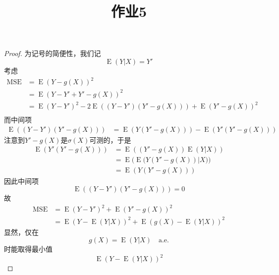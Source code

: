 \documentclass[cn]{homework}
\title{作业5}
\DeclareMathOperator{\E}{E}
\begin{document}
    \maketitle

    \problem
    \begin{proof}
        为记号的简便性，我们记
        \[\E(Y|X)=Y'\]
        考虑
        \[\begin{aligned}
            \mathrm{MSE}
            &=\E(Y-g(X))^2\\
            &=\E(Y-Y'+Y'-g(X))^2\\
            &=\E(Y-Y')^2-2\E((Y-Y')(Y'-g(X)))+\E(Y'-g(X))^2\\
        \end{aligned}\]
        而中间项
        \[\begin{aligned}
            \E((Y-Y')(Y'-g(X)))&=\E(Y(Y'-g(X)))-\E(Y'(Y'-g(X)))
        \end{aligned}\]
        注意到$Y'-g(X)$是$\sigma(X)$可测的，于是
        \[\begin{aligned}
            \E(Y'(Y'-g(X)))&=\E((Y'-g(X))\E(Y|X))\\
            &=\E\Big(\E\big(Y(Y'-g(X))|X\big)\Big)\\
            &=\E(Y(Y'-g(X)))
        \end{aligned}\]
        因此中间项
        \[\E((Y-Y')(Y'-g(X)))=0\]
        故
        \[\begin{aligned}
           \mathrm{MSE}&=\E(Y-Y')^2+\E(Y'-g(X))^2\\
           &=\E(Y-\E(Y|X))^2+\E(g(X)-\E(Y|X))^2
        \end{aligned}\]
        显然，仅在
        \[g(X)=\E(Y|X)\quad\mathrm{a.e.}\]
        时能取得最小值
        \[\E(Y-\E(Y|X))^2\]
    \end{proof}
\end{document}
